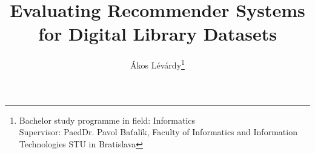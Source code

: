 \documentclass{llncs}
\begin{document}
\title{Evaluating Recommender Systems for Digital Library Datasets}
%
%
\author{Ákos Lévárdy\thanks{Bachelor study programme in field: Informatics \\Supervisor: PaedDr. Pavol Baťalík, Faculty of Informatics and Information Technologies STU in Bratislava }}%
%
%
%
\maketitle              %
%
\end{document}
